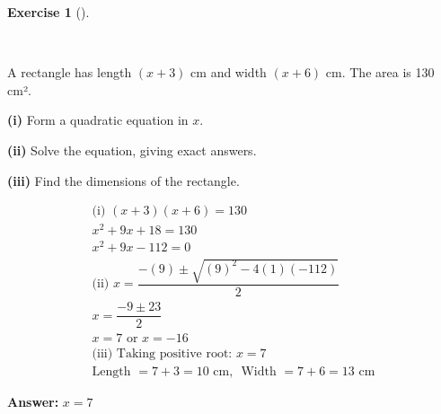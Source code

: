 \documentclass[
  letterpaper,
  DIV=11,
  numbers=noendperiod]{scrreprt}
\theoremstyle{definition}
\newtheorem{exercise}{Exercise}[chapter]
\theoremstyle{remark}
\begin{document}
\begin{exercise}[]\protect\hypertarget{exr-u6-18-3}{}\label{exr-u6-18-3}

~

A rectangle has length \((x + 3)\) cm and width \((x + 6)\) cm. The area
is 130 cm².

\textbf{(i)} Form a quadratic equation in \(x\).

\textbf{(ii)} Solve the equation, giving exact answers.

\textbf{(iii)} Find the dimensions of the rectangle.

\begin{tcolorbox}[enhanced jigsaw, opacitybacktitle=0.6, coltitle=black, arc=.35mm, colframe=quarto-callout-tip-color-frame, colback=white, bottomrule=.15mm, left=2mm, colbacktitle=quarto-callout-tip-color!10!white, titlerule=0mm, opacityback=0, title=\textcolor{quarto-callout-tip-color}{\faLightbulb}\hspace{0.5em}{🔍 View Solution}, leftrule=.75mm, breakable, rightrule=.15mm, bottomtitle=1mm, toptitle=1mm, toprule=.15mm]

\begin{align*}
\text{(i) } (x + 3)(x + 6) = 130 \\ x^2 + 9x + 18 = 130 \\ x^2 +9x - 112 = 0 \\ \text{(ii) } x = \dfrac{-(9) \pm \sqrt{(9)^2 - 4(1)(-112)}}{2} \\ x = \dfrac{-9 \pm 23}{2} \\ x = 7 \text{ or } x = -16 \\ \text{(iii) Taking positive root: } x = 7 \\ \text{Length } = 7 + 3 = 10 \text{ cm, }\text{ Width } = 7 + 6 = 13 \text{ cm}
\end{align*}

\textbf{Answer:} \(x = 7\)

\end{tcolorbox}

\end{exercise}
\end{document}
